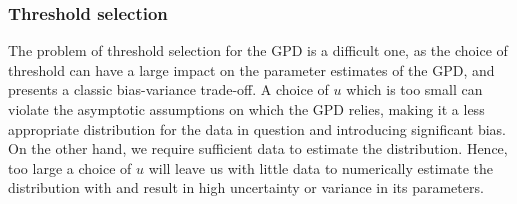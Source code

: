 \documentclass{article}
\numberwithin{equation}{section}
\begin{document}
\subsubsection{Threshold selection} \label{subsubsec:threshold}
The problem of threshold selection for the GPD is a difficult one, as the choice of threshold can have a large impact on the parameter estimates of the GPD, and presents a classic bias-variance trade-off. 
A choice of $u$ which is too small can violate the asymptotic assumptions on which the GPD relies, making it a less appropriate distribution for the data in question and introducing significant bias. 
On the other hand, we require sufficient data to estimate the distribution. 
Hence, too large a choice of $u$ will leave us with little data to numerically estimate the distribution with and result in high uncertainty or variance in its parameters. 
\end{document}
